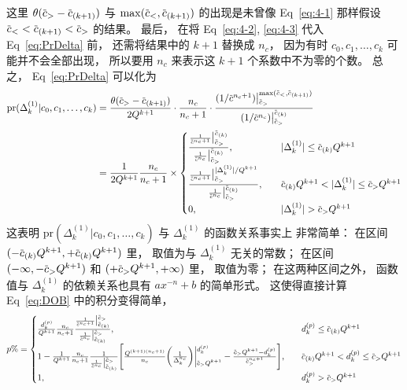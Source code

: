 \documentclass[12pt]{article}
\newcommand*\dmspr{\textrm{pr}}
\newcommand*\dmsvat[3][\big]{#1|_{\raise3pt\hbox{$\scriptstyle#2$}}^{\lower3pt\hbox{$\scriptstyle#3$}}}
\def\dmscbar{\dmsbar{c}}
\def\dmsccck{c_0,c_1,\ldots,c_k}
\def\dmsdeltako{\Delta_k^{(1)}}
\def\dmsdkp{d_k^{(p)}}
\begin{document}
这里 $\theta(\dmscbar_>-\dmscbar_{(k+1)})$ 与
$\max(\dmscbar_<,\dmscbar_{(k+1)})$ 的出现是未曾像 Eq~\eqref{eq:4-1} 那样假设
$\dmscbar_< <\dmscbar_{(k+1)}<\dmscbar_>$ 的结果。
最后，
在将 Eq~\eqref{eq:4-2}, \eqref{eq:4-3} 代入 Eq~\eqref{eq:PrDelta} 前，
还需将结果中的 $k+1$ 替换成 $n_c$，
因为有时 $c_0,c_1,\ldots,c_k$ 可能并不会全部出现，
所以要用 $n_c$ 来表示这 $k+1$ 个系数中不为零的个数。
总之，
Eq~\eqref{eq:PrDelta} 可以化为
\begin{equation}
  \label{eq:PrDeltaSetA}
  \begin{aligned}
    \dmspr(\dmsdeltako|\dmsccck) &=
    \frac{\theta(\dmscbar_>-\dmscbar_{(k+1)})}{2Q^{k+1}}\cdot
    \frac{n_c}{n_c+1}\cdot\frac{(1/\dmscbar^{n_c+1})\dmsvat{\dmscbar_>}{
        \max(\dmscbar_<,\dmscbar_{(k+1)})}}{(1/\dmscbar^{n_c})\dmsvat{
        \dmscbar_>}{\dmscbar_{(k)}}} \\
    &= \frac{1}{2Q^{k+1}} \frac{n_c}{n_c+1} \times
    \begin{cases}
      \frac{\frac{1}{\dmscbar^{n_c+1}}
        \dmsvat{\dmscbar_>}{\dmscbar_{(k)}}}{
        \frac{1}{\dmscbar^{n_c}}
        \dmsvat{\dmscbar_>}{\dmscbar_{(k)}}},
      &\quad |\dmsdeltako|\le\dmscbar_{(k)}Q^{k+1} \\
      \frac{\frac{1}{\dmscbar^{n_c+1}}
        \dmsvat{\dmscbar_>}{|\dmsdeltako|/Q^{k+1}}}{
        \frac{1}{\dmscbar^{n_c}}
        \dmsvat{\dmscbar_>}{\dmscbar_{(k)}}},
      &\quad \dmscbar_{(k)}Q^{k+1}<|\dmsdeltako|\le\dmscbar_>Q^{k+1} \\
      0, &\quad |\dmsdeltako|>\dmscbar_>Q^{k+1}
    \end{cases}
  \end{aligned}
\end{equation}
这表明 $\dmspr(\dmsdeltako|\dmsccck)$ 与 $\dmsdeltako$ 的函数关系事实上
非常简单：
在区间 $(-\dmscbar_{(k)}Q^{k+1},+\dmscbar_{(k)}Q^{k+1})$ 里，
取值为与 $\dmsdeltako$ 无关的常数；
在区间 $(-\infty,-\dmscbar_>Q^{k+1})$ 和 $(+\dmscbar_>Q^{k+1},+\infty)$ 里，
取值为零；
在这两种区间之外，
函数值与 $\dmsdeltako$ 的依赖关系也具有 $ax^{-n}+b$ 的简单形式。
这使得直接计算 Eq~\eqref{eq:DOB} 中的积分变得简单，
\begin{equation}
  \label{eq:DOBSetA}
  p\%=
  \begin{cases}
    \frac{\dmsdkp}{Q^{k+1}} \frac{n_c}{n_c+1}
    \frac{ \frac{1}{\dmscbar^{n_c+1}}\dmsvat{\dmscbar_{(k)}}{\dmscbar_>}}{
      \frac{1}{\dmscbar^{n_c}}\dmsvat{\dmscbar_{(k)}}{\dmscbar_>}},
    &\quad \dmsdkp\le\dmscbar_{(k)}Q^{k+1} \\
    1 - \frac{1}{Q^{k+1}} \frac{n_c}{n_c+1}
    \frac{1}{\frac{1}{\dmscbar^{n_c}}\dmsvat{\dmscbar_{(k)}}{\dmscbar_>}}
    \Biggl[ \frac{Q^{(k+1)(n_c+1)}}{n_c}\biggl( \frac{1}{\Delta_k^{n_c}}
      \biggr)\dmsvat[\bigg]{\dmscbar_>Q^{k+1}}{\dmsdkp}-
      \frac{\dmscbar_>Q^{k+1}-\dmsdkp}{\dmscbar_>^{n_c+1}}\Biggr],
    &\quad \dmscbar_{(k)}Q^{k+1} < \dmsdkp \le \dmscbar_>Q^{k+1} \\
    1, &\quad \dmsdkp > \dmscbar_>Q^{k+1}
  \end{cases}
\end{equation}
\end{document}

